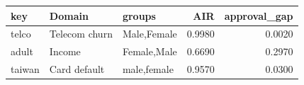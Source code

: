 \begin{tabular}{lllrr}
\toprule
key & Domain & groups & AIR & approval\_gap \\
\midrule
telco & Telecom churn & Male,Female & 0.9980 & 0.0020 \\
adult & Income & Female,Male & 0.6690 & 0.2970 \\
taiwan & Card default & male,female & 0.9570 & 0.0300 \\
\bottomrule
\end{tabular}
